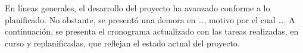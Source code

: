 
En líneas generales, el desarrollo del proyecto ha avanzado conforme a lo planificado. No obstante, se presentó una demora en \ldots, motivo por el cual \ldots. A continuación, se presenta el cronograma actualizado con las tareas realizadas, en curso y replanificadas, que reflejan el estado actual del proyecto.

